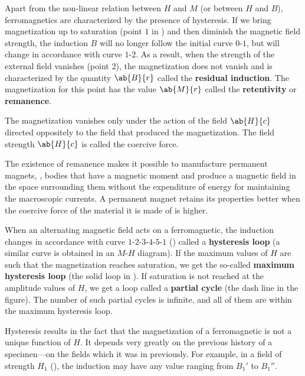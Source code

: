 Apart from the non-linear relation between $H$ and $M$ (or between $H$ and $B$), ferromagnetics are characterized by the presence of hysteresis.
If we bring magnetization up to saturation (point $1$ in ) and then diminish the magnetic field strength, the induction $B$ will no longer follow the initial curve $0$-$1$, but will change in accordance with curve $1$-$2$.
As a result, when the strength of the external field vanishes (point $2$), the magnetization does not vanish and is characterized by the quantity $\ab{B}{r}$ called the \textbf{residual induction}.
The magnetization for this point has the value $\ab{M}{r}$ called the \textbf{retentivity} or \textbf{remanence}.

The magnetization vanishes only under the action of the field $\ab{H}{c}$ directed oppositely to the field that produced the magnetization.
The field strength $\ab{H}{c}$ is called the coercive force.

The existence of remanence makes it possible to manufacture permanent magnets, \ie, bodies that have a magnetic moment and produce a magnetic field in the space surrounding them without the expenditure of energy for maintaining the macroscopic currents.
A permanent magnet retains its properties better when the coercive force of the material it is made of is higher.

When an alternating magnetic field acts on a ferromagnetic, the induction changes in accordance with curve $1$-$2$-$3$-$4$-$5$-$1$ () called a \textbf{hysteresis loop} (a similar curve is obtained in an $M$-$H$ diagram).
If the maximum values of $H$ are such that the magnetization reaches saturation, we get the so-called \textbf{maximum hysteresis loop} (the solid loop in ).
If saturation is not reached at the amplitude values of $H$, we get a loop called a \textbf{partial cycle} (the dash line in the figure).
The number of such partial cycles is infinite, and all of them are within the maximum hysteresis loop.

Hysteresis results in the fact that the magnetization of a ferromagnetic is not a unique function of $H$.
It depends very greatly on the previous history of a specimen---on the fields which it was in previously.
For example, in a field of strength $H_1$ (), the induction may have any value ranging from $B_1'$ to $B_1''$.

